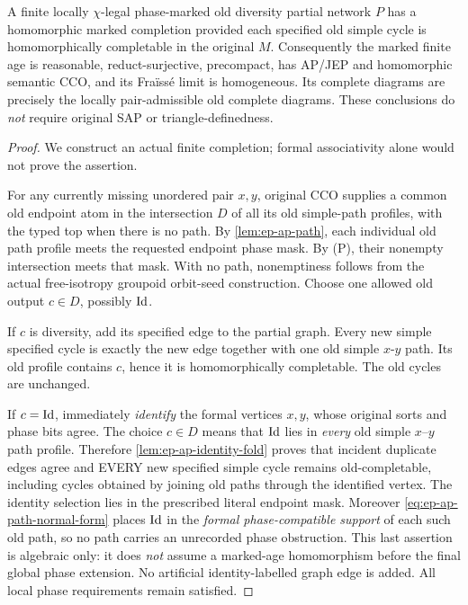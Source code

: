 \begin{theorem}
\label{thm:ep-ap-marked-completion}
A finite locally \(\chi\)-legal phase-marked
old diversity partial network \(P\)
has a homomorphic marked completion
provided each specified old simple
cycle is homomorphically completable in
the original \(M\).
Consequently the marked finite age
is reasonable, reduct-surjective,
precompact, has AP/JEP and homomorphic
semantic CCO, and its Fra\"iss\'e
limit is homogeneous.
Its complete diagrams are precisely
the locally pair-admissible old
complete diagrams.
These conclusions do \emph{not}
require original SAP or triangle-definedness.
\end{theorem}
\begin{proof}
We construct an actual finite completion;
formal associativity alone would not
prove the assertion.

For any currently missing unordered
pair \(x,y\), original CCO supplies a
common old endpoint atom in the
intersection \(D\) of all its old
simple-path profiles, with the
typed top when there is no path.
By \cref{lem:ep-ap-path}, each
individual old path profile meets the
requested endpoint phase mask.
By (P), their nonempty intersection
meets that mask. With no path,
nonemptiness follows from the actual
free-isotropy groupoid orbit-seed
construction. Choose one allowed
old output \(c\in D\), possibly
\(\mathrm{Id}\).

If \(c\) is diversity, add its
specified edge to the partial graph.
Every new simple specified cycle is
exactly the new edge together with
one old simple \(x\)-\(y\) path.
Its old profile contains \(c\), hence
it is homomorphically completable.
The old cycles are unchanged.

If \(c=\mathrm{Id}\), immediately
\emph{identify} the formal vertices
\(x,y\), whose original sorts and
phase bits agree. The choice \(c\in D\)
means that \(\mathrm{Id}\) lies in \emph{every}
old simple \(x\)--\(y\) path profile.
Therefore \cref{lem:ep-ap-identity-fold}
proves that incident duplicate edges agree
and EVERY new specified simple cycle remains
old-completable, including cycles obtained by
joining old paths through the identified vertex.
The identity selection lies in the prescribed
literal endpoint mask. Moreover
\eqref{eq:ep-ap-path-normal-form}
places \(\mathrm{Id}\) in the \emph{formal
phase-compatible support} of each such old
path, so no path carries an unrecorded
phase obstruction. This last assertion is
algebraic only: it does \emph{not} assume
a marked-age homomorphism before the final
global phase extension. No artificial
identity-labelled graph edge is added.
All local phase requirements remain satisfied.


\end{proof}
